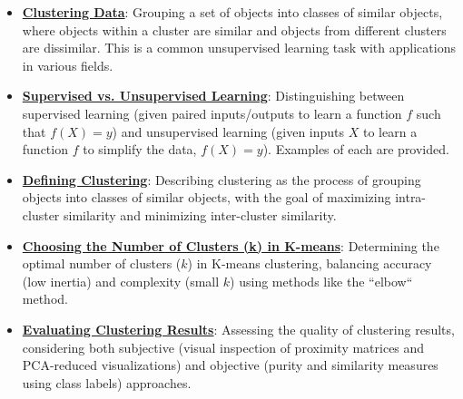 \documentclass{article}%
\begin{document}
\begin{itemize}[leftmargin=*]%
\item \href{https://purdue.brightspace.com/d2l/common/assets/pdfjs-d2l-dist/1.0.14-legacy/web/viewer.html?file=\%2Fcontent\%2Fenforced\%2F1095467-wl.202510.CS.24300.001\%2F12L2-distance-clusters.pdf\%3Fou\%3D1095467\&lang=en-us\&container=d2l-fileviewer-rendered-pdf\&fullscreen=d2l-fileviewer-rendered-pdf-dialog\&height=667#page=4}{\textbf{Clustering Data}}: Grouping a set of objects into classes of similar objects, where objects within a cluster are similar and objects from different clusters are dissimilar. This is a common unsupervised learning task with applications in various fields.%
\item \href{https://purdue.brightspace.com/d2l/common/assets/pdfjs-d2l-dist/1.0.14-legacy/web/viewer.html?file=\%2Fcontent\%2Fenforced\%2F1095467-wl.202510.CS.24300.001\%2F12L2-distance-clusters.pdf\%3Fou\%3D1095467\&lang=en-us\&container=d2l-fileviewer-rendered-pdf\&fullscreen=d2l-fileviewer-rendered-pdf-dialog\&height=667#page=3}{\textbf{Supervised vs. Unsupervised Learning}}: Distinguishing between supervised learning (given paired inputs/outputs to learn a function $f$ such that $f(X) = y$) and unsupervised learning (given inputs $X$ to learn a function $f$ to simplify the data, $f(X) = y$). Examples of each are provided.%
\item \href{https://purdue.brightspace.com/d2l/common/assets/pdfjs-d2l-dist/1.0.14-legacy/web/viewer.html?file=\%2Fcontent\%2Fenforced\%2F1095467-wl.202510.CS.24300.001\%2F12L2-distance-clusters.pdf\%3Fou\%3D1095467\&lang=en-us\&container=d2l-fileviewer-rendered-pdf\&fullscreen=d2l-fileviewer-rendered-pdf-dialog\&height=667#page=4}{\textbf{Defining Clustering}}: Describing clustering as the process of grouping objects into classes of similar objects, with the goal of maximizing intra-cluster similarity and minimizing inter-cluster similarity.%
\item \href{https://purdue.brightspace.com/d2l/common/assets/pdfjs-d2l-dist/1.0.14-legacy/web/viewer.html?file=\%2Fcontent\%2Fenforced\%2F1095467-wl.202510.CS.24300.001\%2F12L2-distance-clusters.pdf\%3Fou\%3D1095467\&lang=en-us\&container=d2l-fileviewer-rendered-pdf\&fullscreen=d2l-fileviewer-rendered-pdf-dialog\&height=667#page=33}{\textbf{Choosing the Number of Clusters (k) in K{-}means}}: Determining the optimal number of clusters ($k$) in K-means clustering, balancing accuracy (low inertia) and complexity (small $k$) using methods like the ``elbow`` method.%
\item \href{https://purdue.brightspace.com/d2l/common/assets/pdfjs-d2l-dist/1.0.14-legacy/web/viewer.html?file=\%2Fcontent\%2Fenforced\%2F1095467-wl.202510.CS.24300.001\%2F12L2-distance-clusters.pdf\%3Fou\%3D1095467\&lang=en-us\&container=d2l-fileviewer-rendered-pdf\&fullscreen=d2l-fileviewer-rendered-pdf-dialog\&height=667#page=32}{\textbf{Evaluating Clustering Results}}: Assessing the quality of clustering results, considering both subjective (visual inspection of proximity matrices and PCA-reduced visualizations) and objective (purity and similarity measures using class labels) approaches.%

\end{itemize}
\end{document}
